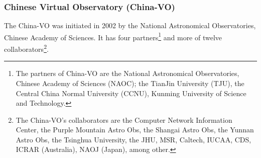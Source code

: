 \subsubsection{Chinese Virtual Observatory (China-VO)}
The China-VO \cite{website:china-vo-home} was initiated in 2002 by the National
Astronomical Observatories, Chinese Academy of Sciences. It has four
partners\footnote{The partners of China-VO are the National Astronomical
Observatories, Chinese Academy of Sciences (NAOC); the TianJin University (TJU),
the Central China Normal University (CCNU), Kunming University of Science and
Technology.} and more of twelve collaborators\footnote{The China-VO's
collaborators are the Computer Network Information Center, the Purple Mountain
Astro Obs, the Shangai Astro Obs, the Yunnan Astro Obs, the Tsinghua University,
the JHU, MSR, Caltech, IUCAA, CDS, ICRAR (Australia), NAOJ (Japan), among
other.}.

